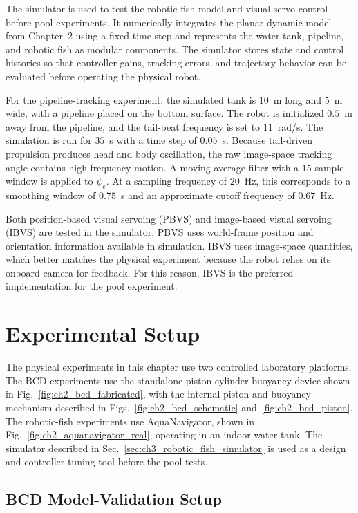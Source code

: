 \documentclass{uhcoethesis}
\begin{document}
The simulator is used to test the robotic-fish model and visual-servo control before pool experiments. It numerically integrates the planar dynamic model from Chapter~2 using a fixed time step and represents the water tank, pipeline, and robotic fish as modular components. The simulator stores state and control histories so that controller gains, tracking errors, and trajectory behavior can be evaluated before operating the physical robot.

For the pipeline-tracking experiment, the simulated tank is $10$~m long and $5$~m wide, with a pipeline placed on the bottom surface. The robot is initialized $0.5$~m away from the pipeline, and the tail-beat frequency is set to $11$~rad/s. The simulation is run for $35$~s with a time step of $0.05$~s. Because tail-driven propulsion produces head and body oscillation, the raw image-space tracking angle contains high-frequency motion. A moving-average filter with a $15$-sample window is applied to $\psi_e$. At a sampling frequency of $20$~Hz, this corresponds to a smoothing window of $0.75$~s and an approximate cutoff frequency of $0.67$~Hz.

Both position-based visual servoing (PBVS) and image-based visual servoing (IBVS) are tested in the simulator. PBVS uses world-frame position and orientation information available in simulation. IBVS uses image-space quantities, which better matches the physical experiment because the robot relies on its onboard camera for feedback. For this reason, IBVS is the preferred implementation for the pool experiment.

\section{Experimental Setup}
\label{sec:ch3_experimental_setup}

The physical experiments in this chapter use two controlled laboratory platforms. The BCD experiments use the standalone piston-cylinder buoyancy device shown in Fig.~\ref{fig:ch2_bcd_fabricated}, with the internal piston and buoyancy mechanism described in Figs.~\ref{fig:ch2_bcd_schematic} and~\ref{fig:ch2_bcd_piston}. The robotic-fish experiments use AquaNavigator, shown in Fig.~\ref{fig:ch2_aquanavigator_real}, operating in an indoor water tank. The simulator described in Sec.~\ref{sec:ch3_robotic_fish_simulator} is used as a design and controller-tuning tool before the pool tests.

\subsection{BCD Model-Validation Setup}
\label{sec:ch3_bcd_validation_setup}
\end{document}
